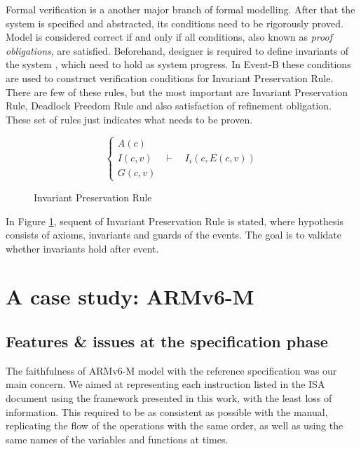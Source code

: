 \documentclass[conference]{IEEEtran}
\begin{document}
Formal verification is a another major branch of formal modelling. After that the system is
specified and abstracted, its conditions need to be rigorously proved. Model is considered
correct if and only if all conditions, also known as \textit{proof obligations}, are
satisfied. Beforehand, designer is required to define invariants of the system , which need to
hold as system progress. In Event-B these conditions are used to construct verification
conditions for Invariant Preservation Rule. There are few of these rules, but the most
important are Invariant Preservation Rule, Deadlock Freedom Rule and also satisfaction of
refinement obligation. These set of rules just indicates what needs to be proven.

\begin{figure}[ht!]
\begin{center}
	$$\begin{cases}
	A(c)\\
	I(c, v) & \vdash \quad I_i(c, E(c,v))\\
	G(c, v)
  \end{cases}$$
	\caption{Invariant Preservation Rule}
	\label{fig:eveB}
\end{center}
\end{figure}

In Figure \ref{fig:eveB}, sequent of Invariant Preservation Rule is stated, where hypothesis
consists of axioms, invariants and guards of the events. The goal is to validate whether
invariants hold after event.


\section{A case study: ARMv6-M}
\label{sec:arm}

\subsection{Features \& issues at the specification phase}
\label{sec:feat}
The faithfulness of ARMv6-M model with the reference specification was our main concern.
We aimed at representing each instruction listed in the ISA document using the
framework presented in this work, with the least loss of information. This required to be
as consistent as possible with the manual, replicating the flow of the operations with
the same order, as well as using the same names of the variables and functions at times.
\end{document}

